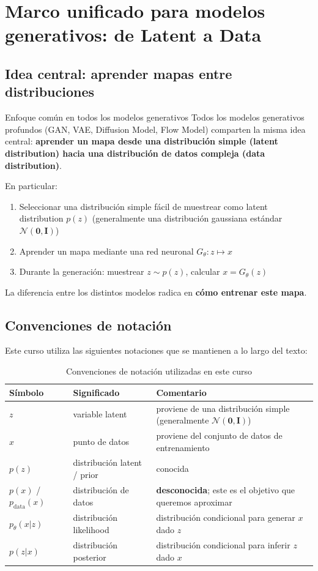 \section{Marco unificado para modelos generativos: de Latent a Data}

\subsection{Idea central: aprender mapas entre distribuciones}

\begin{importantbox}{Enfoque común en todos los modelos generativos}
Todos los modelos generativos profundos (GAN, VAE, Diffusion Model, Flow Model) comparten la misma idea central: \textbf{aprender un mapa desde una distribución simple (latent distribution) hacia una distribución de datos compleja (data distribution)}.

En particular:
\begin{enumerate}
    \item Seleccionar una distribución simple fácil de muestrear como latent distribution $p(z)$ (generalmente una distribución gaussiana estándar $\mathcal{N}(\mathbf{0}, \mathbf{I})$)
    \item Aprender un mapa mediante una red neuronal $G_\theta: z \mapsto x$
    \item Durante la generación: muestrear $z \sim p(z)$, calcular $x = G_\theta(z)$
\end{enumerate}
La diferencia entre los distintos modelos radica en \textbf{cómo entrenar este mapa}.
\end{importantbox}

\subsection{Convenciones de notación}

Este curso utiliza las siguientes notaciones que se mantienen a lo largo del texto:

\begin{table}[H]
\centering
\begin{tabular}{lll}
\toprule
Símbolo & Significado & Comentario \\
\midrule
$z$ & variable latent & proviene de una distribución simple (generalmente $\mathcal{N}(\mathbf{0}, \mathbf{I})$) \\
$x$ & punto de datos & proviene del conjunto de datos de entrenamiento \\
$p(z)$ & distribución latent / prior & conocida \\
$p(x)$ / $p_{\text{data}}(x)$ & distribución de datos & \textbf{desconocida}; este es el objetivo que queremos aproximar \\
$p_\theta(x|z)$ & distribución likelihood & distribución condicional para generar $x$ dado $z$ \\
$p(z|x)$ & distribución posterior & distribución condicional para inferir $z$ dado $x$ \\
\bottomrule
\end{tabular}
\caption{Convenciones de notación utilizadas en este curso}
\end{table}

